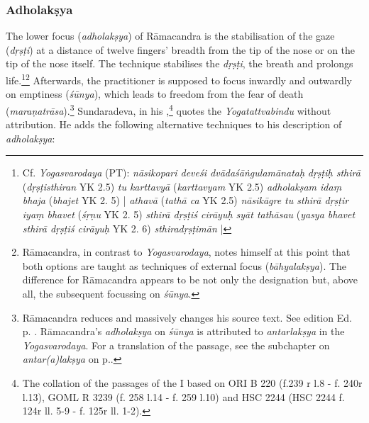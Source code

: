 \subsubsection{Adholakṣya}
The lower focus (\textit{adholakṣya}) of Rāmacandra is the stabilisation of the gaze (\textit{dṛṣṭi}) at a distance of twelve fingers' breadth from the tip of the nose or on the tip of the nose itself. The technique stabilises the \textit{dṛṣṭi}, the breath and prolongs life.\footnote{Cf. \emph{Yogasvarodaya} (PT): \textit{nāsikopari deveśi dvādaśāṅgulamānataḥ} \textit{dṛṣṭiḥ sthirā} (\textit{dṛṣṭisthiran} YK 2.5) \textit{tu karttavyā} (\textit{karttavyam} YK 2.5) \textit{adholakṣam idaṃ bhaja} (\textit{bhajet} YK 2. 5) | \textit{athavā} (\textit{tathā ca} YK 2.5) \textit{nāsikāgre tu sthirā dṛṣṭir iyaṃ bhavet} (\textit{śṛṇu} YK 2. 5) \textit{sthirā dṛṣṭiś cirāyuḥ syāt tathāsau} (\textit{yasya bhavet sthirā dṛṣṭiś cirāyuḥ} YK 2. 6) \textit{sthiradṛṣṭimān} |}\footnote{Rāmacandra, in contrast to \textit{Yogasvarodaya}, notes himself at this point that both options are taught as techniques of external focus (\textit{bāhyalakṣya}). The difference for Rāmacandra appears to be not only the designation but, above all, the subsequent focussing on \textit{śūnya}.} Afterwards, the practitioner is supposed to focus inwardly and outwardly on emptiness (\textit{śūnya}), which leads to freedom from the fear of death (\textit{maraṇatrāsa}).\footnote{Rāmacandra reduces and massively changes his source text. See edition  Ed. p. \pageref{adholaksya}. Rāmacandra's \textit{adholakṣya} on \textit{śūnya} is attributed to \textit{antarlakṣya} in the \textit{Yogasvarodaya}. For a translation of the passage, see the subchapter on \textit{antar(a)lakṣya} on p.\pageref{antarsvayotrans}.} 
\label{samketaadd1}
Sundaradeva, in his ,\footnote{The collation of the passages of the  I based on ORI B 220 (f.239 r l.8 - f. 240r l.13), GOML R 3239 (f. 258 l.14 - f. 259 l.10) and HSC 2244 (HSC 2244 f. 124r ll. 5-9 - f. 125r ll. 1-2).} quotes the \textit{Yogatattvabindu} without attribution. He adds the following alternative techniques to his description of \textit{adholakṣya}: 
